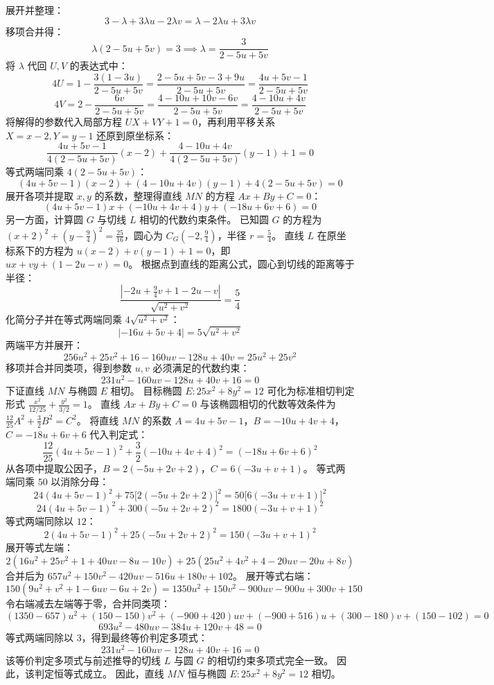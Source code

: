 \begin{solution}
展开并整理：
$$ 3 - \lambda + 3\lambda u - 2\lambda v = \lambda - 2\lambda u + 3\lambda v $$
移项合并得：
$$ \lambda(2 - 5u + 5v) = 3 \implies \lambda = \frac{3}{2 - 5u + 5v} $$
将 $\lambda$ 代回 $U, V$ 的表达式中：
$$ 4U = 1 - \frac{3(1 - 3u)}{2 - 5u + 5v} = \frac{2 - 5u + 5v - 3 + 9u}{2 - 5u + 5v} = \frac{4u + 5v - 1}{2 - 5u + 5v} $$
$$ 4V = 2 - \frac{6v}{2 - 5u + 5v} = \frac{4 - 10u + 10v - 6v}{2 - 5u + 5v} = \frac{4 - 10u + 4v}{2 - 5u + 5v} $$
将解得的参数代入局部方程 $UX + VY + 1 = 0$，再利用平移关系 $X = x - 2, Y = y - 1$ 还原到原坐标系：
$$ \frac{4u + 5v - 1}{4(2 - 5u + 5v)}(x - 2) + \frac{4 - 10u + 4v}{4(2 - 5u + 5v)}(y - 1) + 1 = 0 $$
等式两端同乘 $4(2 - 5u + 5v)$：
$$ (4u + 5v - 1)(x - 2) + (4 - 10u + 4v)(y - 1) + 4(2 - 5u + 5v) = 0 $$
展开各项并提取 $x, y$ 的系数，整理得直线 $MN$ 的方程 $Ax + By + C = 0$：
$$ (4u + 5v - 1)x + (-10u + 4v + 4)y + (-18u + 6v + 6) = 0 $$
另一方面，计算圆 $G$ 与切线 $L$ 相切的代数约束条件。
已知圆 $G$ 的方程为 $(x+2)^2 + \left(y-\frac{9}{4}\right)^2 = \frac{25}{16}$，圆心为 $C_G\left(-2, \frac{9}{4}\right)$，半径 $r = \frac{5}{4}$。
直线 $L$ 在原坐标系下的方程为 $u(x - 2) + v(y - 1) + 1 = 0$，即 $ux + vy + (1 - 2u - v) = 0$。
根据点到直线的距离公式，圆心到切线的距离等于半径：
$$ \frac{\left| -2u + \frac{9}{4}v + 1 - 2u - v \right|}{\sqrt{u^2 + v^2}} = \frac{5}{4} $$
化简分子并在等式两端同乘 $4\sqrt{u^2 + v^2}$：
$$ |-16u + 5v + 4| = 5\sqrt{u^2 + v^2} $$
两端平方并展开：
$$ 256u^2 + 25v^2 + 16 - 160uv - 128u + 40v = 25u^2 + 25v^2 $$
移项并合并同类项，得到参数 $u, v$ 必须满足的代数约束：
$$ 231u^2 - 160uv - 128u + 40v + 16 = 0 $$
下证直线 $MN$ 与椭圆 $E$ 相切。
目标椭圆 $E: 25x^2 + 8y^2 = 12$ 可化为标准相切判定形式 $\frac{x^2}{12/25} + \frac{y^2}{3/2} = 1$。
直线 $Ax + By + C = 0$ 与该椭圆相切的代数等效条件为 $\frac{12}{25}A^2 + \frac{3}{2}B^2 = C^2$。
将直线 $MN$ 的系数 $A = 4u + 5v - 1$，$B = -10u + 4v + 4$，$C = -18u + 6v + 6$ 代入判定式：
$$ \frac{12}{25}(4u + 5v - 1)^2 + \frac{3}{2}(-10u + 4v + 4)^2 = (-18u + 6v + 6)^2 $$
从各项中提取公因子，$B = 2(-5u + 2v + 2)$，$C = 6(-3u + v + 1)$。
等式两端同乘 $50$ 以消除分母：
$$ 24(4u + 5v - 1)^2 + 75\big[2(-5u + 2v + 2)\big]^2 = 50\big[6(-3u + v + 1)\big]^2 $$
$$ 24(4u + 5v - 1)^2 + 300(-5u + 2v + 2)^2 = 1800(-3u + v + 1)^2 $$
等式两端同除以 $12$：
$$ 2(4u + 5v - 1)^2 + 25(-5u + 2v + 2)^2 = 150(-3u + v + 1)^2 $$
展开等式左端：
$$ 2(16u^2 + 25v^2 + 1 + 40uv - 8u - 10v) + 25(25u^2 + 4v^2 + 4 - 20uv - 20u + 8v) $$
合并后为 $657u^2 + 150v^2 - 420uv - 516u + 180v + 102$。
展开等式右端：
$$ 150(9u^2 + v^2 + 1 - 6uv - 6u + 2v) = 1350u^2 + 150v^2 - 900uv - 900u + 300v + 150 $$
令右端减去左端等于零，合并同类项：
$$ (1350 - 657)u^2 + (150 - 150)v^2 + (-900 + 420)uv + (-900 + 516)u + (300 - 180)v + (150 - 102) = 0 $$
$$ 693u^2 - 480uv - 384u + 120v + 48 = 0 $$
等式两端同除以 $3$，得到最终等价判定多项式：
$$ 231u^2 - 160uv - 128u + 40v + 16 = 0 $$
该等价判定多项式与前述推导的切线 $L$ 与圆 $G$ 的相切约束多项式完全一致。
因此，该判定恒等式成立。
因此，直线 $MN$ 恒与椭圆 $E: 25x^2 + 8y^2 = 12$ 相切。
\end{solution}

